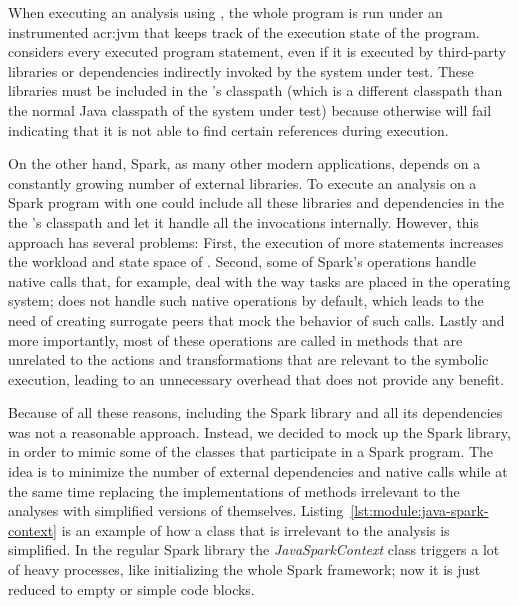 
When executing an analysis using \jpf{}, the whole program is run under an instrumented \acrshort{acr:jvm} that keeps track of the execution state of the program. \jpf{} considers every executed program statement, even if it is executed by third-party libraries or dependencies indirectly invoked by the system under test. These libraries must be included in the \jpf{}'s classpath (which is a different classpath than the normal Java classpath of the system under test) because otherwise \jpf{} will fail indicating that it is not able to find certain references during execution.

On the other hand, Spark, as many other modern applications, depends on a constantly growing number of external libraries. To execute an analysis on a Spark program with \jpf{} one could include all these libraries and dependencies in the the \jpf{}'s classpath and let it handle all the invocations internally. However, this approach has several problems: First, the execution of more statements increases the workload and state space of \jpf{}. Second, some of Spark's operations handle native calls that, for example, deal with the way tasks are placed in the operating system; \jpf{} does not handle such native operations by default, which leads to the need of creating surrogate peers that mock the behavior of such calls. Lastly and more importantly, most of these operations are called in methods that are unrelated to the actions and transformations that are relevant to the symbolic execution, leading to an unnecessary overhead that does not provide any benefit.

Because of all these reasons, including the Spark library and all its dependencies was not a reasonable approach. Instead, we decided to mock up the Spark library, in order to mimic some of the classes that participate in a Spark program. The idea is to minimize the number of external dependencies and native calls while at the same time replacing the implementations of methods irrelevant to the analyses with simplified versions of themselves. Listing~\ref{lst:module:java-spark-context} is an example of how a class that is irrelevant to the analysis is simplified. In the regular Spark library the \textit{JavaSparkContext} class triggers a lot of heavy processes, like initializing the whole Spark framework; now it is just reduced to empty or simple code blocks.

